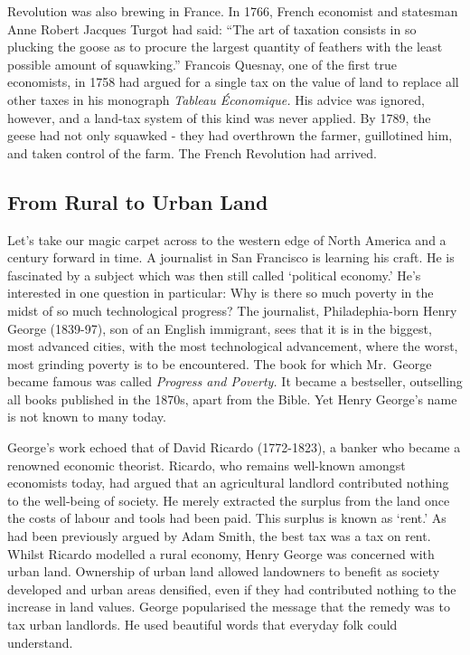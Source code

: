 \documentclass[]{tufte-handout}
\begin{document}
Revolution was also brewing in France. In 1766, French economist and
statesman Anne Robert Jacques Turgot had said: ``The art of taxation
consists in so plucking the goose as to procure the largest quantity of
feathers with the least possible amount of squawking.'' Francois
Quesnay, one of the first true economists, in 1758 had argued for a
single tax on the value of land to replace all other taxes in his
monograph \emph{Tableau Économique.} His advice was ignored, however,
and a land-tax system of this kind was never applied. By 1789, the geese
had not only squawked - they had overthrown the farmer, guillotined him,
and taken control of the farm. The French Revolution had arrived.

\hypertarget{from-rural-to-urban-land}{%
\subsection{From Rural to Urban Land}\label{from-rural-to-urban-land}}

Let's take our magic carpet across to the western edge of North America
and a century forward in time. A journalist in San Francisco is learning
his craft. He is fascinated by a subject which was then still called
`political economy.' He's interested in one question in particular: Why
is there so much poverty in the midst of so much technological progress?
The journalist, Philadephia-born Henry George (1839-97), son of an
English immigrant, sees that it is in the biggest, most advanced cities,
with the most technological advancement, where the worst, most grinding
poverty is to be encountered. The book for which Mr.~George became
famous was called \emph{Progress and Poverty.} It became a bestseller,
outselling all books published in the 1870s, apart from the Bible. Yet
Henry George's name is not known to many today.

George's work echoed that of David Ricardo (1772-1823), a banker who
became a renowned economic theorist. Ricardo, who remains well-known
amongst economists today, had argued that an agricultural landlord
contributed nothing to the well-being of society. He merely extracted
the surplus from the land once the costs of labour and tools had been
paid. This surplus is known as `rent.' As had been previously argued by
Adam Smith, the best tax was a tax on rent. Whilst Ricardo modelled a
rural economy, Henry George was concerned with urban land. Ownership of
urban land allowed landowners to benefit as society developed and urban
areas densified, even if they had contributed nothing to the increase in
land values. George popularised the message that the remedy was to tax
urban landlords. He used beautiful words that everyday folk could
understand.
\end{document}
